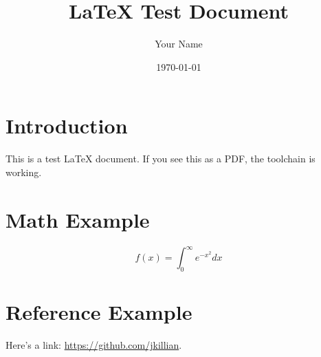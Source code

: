 \documentclass{article}
\title{LaTeX Test Document}
\author{Your Name}
\date{\today}
\begin{document}
\maketitle

\section{Introduction}
This is a test LaTeX document. If you see this as a PDF, the toolchain is working.

\section{Math Example}
\[
f(x) = \int_{0}^{\infty} e^{-x^2} dx
\]

\section{Reference Example}
Here’s a link: \url{https://github.com/jkillian}.
\end{document}
